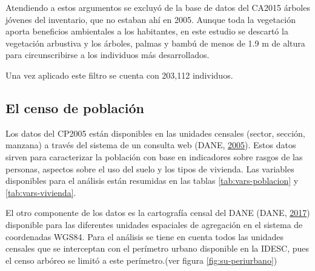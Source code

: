 \documentclass[12pt,a4paper,openany]{book}
\theoremstyle{definition}
\theoremstyle{definition}
\theoremstyle{definition}
\theoremstyle{remark}
\begin{document}
Atendiendo a estos argumentos se excluyó de la base de datos del CA2015
árboles jóvenes del inventario, que no estaban ahí en 2005. Aunque toda
la vegetación aporta beneficios ambientales a los habitantes, en este
estudio se descartó la vegetación arbustiva y los árboles, palmas y
bambú de menos de 1.9 m de altura para circunscribirse a los individuos
más desarrollados.

Una vez aplicado este filtro se cuenta con 203,112 individuos.

\subsection{El censo de población}\label{el-censo-de-poblacion}

Los datos del CP2005 están disponibles en las unidades censales (sector,
sección, manzana) a través del sistema de un consulta web (DANE,
\protect\hyperlink{ref-censo_sistema_dane}{2005}). Estos datos sirven
para caracterizar la población con base en indicadores sobre rasgos de
las personas, aspectos sobre el uso del suelo y los tipos de vivienda.
Las variables disponibles para el análisis están resumidas en las tablas
\ref{tab:vars-poblacion} y \ref{tab:vars-vivienda}.

El otro componente de los datos es la cartografía censal del DANE (DANE,
\protect\hyperlink{ref-geoportal_DANE}{2017}) disponible para las
diferentes unidades espaciales de agregación en el sistema de
coordenadas WGS84. Para el análisis se tiene en cuenta todos las
unidades censales que se interceptan con el perímetro urbano disponible
en la IDESC, pues el censo arbóreo se limitó a este perímetro.(ver
figura \ref{fig:su-periurbano})
\end{document}
